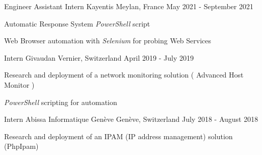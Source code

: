 \begin{cventries}
	\cventry
	{Engineer Assistant Intern} %
	{Kayentis} %
	{Meylan, France} %
	{May 2021 - September 2021} %
	{
		\begin{cvitems} %
		\item {Automatic Response System \emph{PowerShell} script}
		\item {Web Browser automation with \emph{Selenium} for probing Web Services}
		\end{cvitems}
	}

	\cventry
	{Intern} %
	{Givaudan} %
	{Vernier, Switzerland} %
	{April 2019 - July 2019} %
	{
		\begin{cvitems} %
		\item {Research and deployment of a network monitoring solution ( Advanced Host Monitor )}
		\item {\emph{PowerShell} scripting for automation}
		\end{cvitems}
	}

	\cventry
	{Intern} %
	{Abissa Informatique Genève} %
	{Genève, Switzerland} %
	{July 2018 - August 2018} %
	{
		\begin{cvitems} %
		\item {Research and deployment of an IPAM (IP address management) solution (PhpIpam)}
		\end{cvitems}
	}
\end{cventries}

